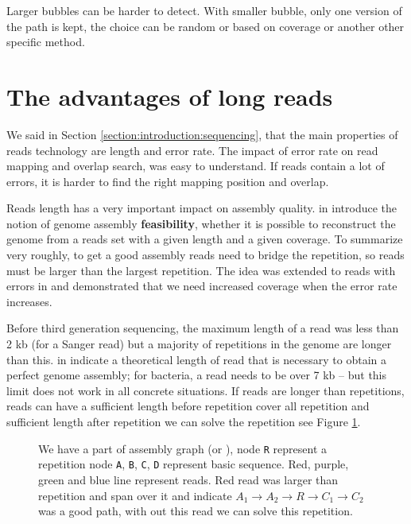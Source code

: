 \documentclass[main]{subfiles}
\begin{document}
Larger bubbles can be harder to detect. With smaller bubble, only one version of the path is kept, the choice can be random or based on coverage or another other specific method.

\section{The advantages of long reads}

We said in Section \ref{section:introduction:sequencing}, that the main properties of reads technology are length and error rate. The impact of error rate on read mapping and overlap search, was easy to understand. If reads contain a lot of errors, it is harder to find the right mapping position and overlap.

Reads length has a very important impact on assembly quality. \citeauthor{Bresler_Tse} in \cite{Bresler_Tse} introduce the notion of genome assembly \textbf{feasibility}, whether it is possible to reconstruct the genome from a reads set with a given length and a given coverage. To summarize very roughly, to get a good assembly reads need to bridge the repetition, so reads must be larger than the largest repetition. The idea was extended to reads with errors in \cite{feasibility_with_error} and demonstrated that we need increased coverage when the error rate increases.

Before third generation sequencing, the maximum length of a read was less than 2 kb (for a Sanger read) but a majority of repetitions in the genome are longer than this. \citeauthor{one_chromosome_one_contig} in \cite{one_chromosome_one_contig} indicate a theoretical length of read that is necessary to obtain a perfect genome assembly; for bacteria, a read needs to be over 7 kb – but this limit does not work in all concrete situations. If reads are longer than repetitions, reads can have a sufficient length before repetition cover all repetition and sufficient length after repetition we can solve the repetition see Figure \ref{intro:fig:whylongreads}.

\begin{figure}[ht]
    \centering
    
    \caption{We have a part of assembly graph (\OLC or \DBG), node \texttt{R} represent a repetition node \texttt{A}, \texttt{B}, \texttt{C}, \texttt{D} represent basic sequence. Red, purple, green and blue line represent reads. Red read was larger than repetition and span over it and indicate $A_1 \rightarrow A_2 \rightarrow R \rightarrow C_1 \rightarrow C_2$ was a good path, with out this read we can solve this repetition.}
    \label{intro:fig:whylongreads}
\end{figure}
\end{document}
